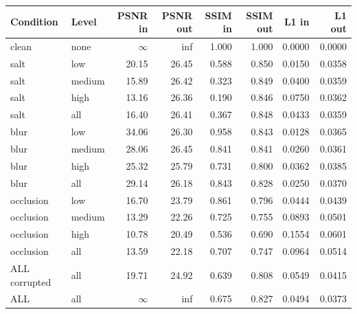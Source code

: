 \begin{tabular}{llrrrrrr}
\hline
Condition & Level & PSNR in & PSNR out & SSIM in & SSIM out & L1 in & L1 out \\
\hline
clean & none & $\infty$ & inf & 1.000 & 1.000 & 0.0000 & 0.0000 \\
salt & low & 20.15 & 26.45 & 0.588 & 0.850 & 0.0150 & 0.0358 \\
salt & medium & 15.89 & 26.42 & 0.323 & 0.849 & 0.0400 & 0.0359 \\
salt & high & 13.16 & 26.36 & 0.190 & 0.846 & 0.0750 & 0.0362 \\
salt & all & 16.40 & 26.41 & 0.367 & 0.848 & 0.0433 & 0.0359 \\
blur & low & 34.06 & 26.30 & 0.958 & 0.843 & 0.0128 & 0.0365 \\
blur & medium & 28.06 & 26.45 & 0.841 & 0.841 & 0.0260 & 0.0361 \\
blur & high & 25.32 & 25.79 & 0.731 & 0.800 & 0.0362 & 0.0385 \\
blur & all & 29.14 & 26.18 & 0.843 & 0.828 & 0.0250 & 0.0370 \\
occlusion & low & 16.70 & 23.79 & 0.861 & 0.796 & 0.0444 & 0.0439 \\
occlusion & medium & 13.29 & 22.26 & 0.725 & 0.755 & 0.0893 & 0.0501 \\
occlusion & high & 10.78 & 20.49 & 0.536 & 0.690 & 0.1554 & 0.0601 \\
occlusion & all & 13.59 & 22.18 & 0.707 & 0.747 & 0.0964 & 0.0514 \\
ALL corrupted & all & 19.71 & 24.92 & 0.639 & 0.808 & 0.0549 & 0.0415 \\
ALL & all & $\infty$ & inf & 0.675 & 0.827 & 0.0494 & 0.0373 \\
\hline
\end{tabular}
